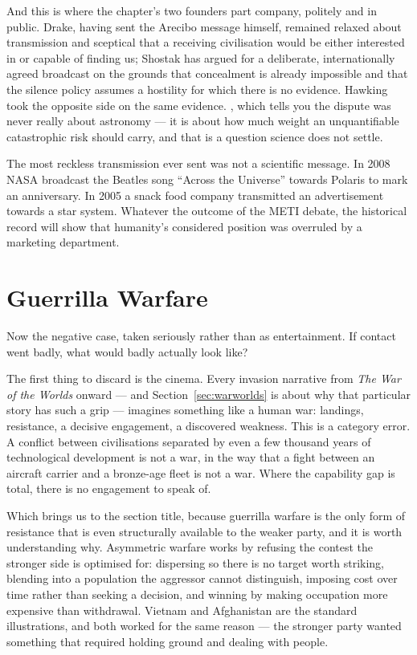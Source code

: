 And this is where the chapter's two founders part company, politely and in public. Drake, having sent
the Arecibo message himself, remained relaxed about transmission and sceptical that a receiving
civilisation would be either interested in or capable of finding us; Shostak has argued for a
deliberate, internationally agreed broadcast on the grounds that concealment is already impossible and
that the silence policy assumes a hostility for which there is no evidence. Hawking took the opposite
side on the same evidence. , which tells you the dispute was never really about astronomy --- it is about how
much weight an unquantifiable catastrophic risk should carry, and that is a question science does not
settle.

\begin{funfact}
The most reckless transmission ever sent was not a scientific message. In 2008 NASA broadcast the
Beatles song ``Across the Universe'' towards Polaris to mark an anniversary. In 2005 a snack food
company transmitted an advertisement towards a star system. Whatever the outcome of the METI debate,
the historical record will show that humanity's considered position was overruled by a marketing
department.
\end{funfact}

\section{Guerrilla Warfare}\label{sec:guerrilla}

Now the negative case, taken seriously rather than as entertainment. If contact went badly, what
would badly actually look like?

The first thing to discard is the cinema. Every invasion narrative from \emph{The War of the Worlds}
onward --- and Section~\ref{sec:warworlds} is about why that particular story has such a grip --- imagines
something like a human war: landings, resistance, a decisive engagement, a discovered weakness. This
is a category error. A conflict between civilisations separated by even a few thousand years of
technological development is not a war, in the way that a fight between an aircraft carrier and a
bronze-age fleet is not a war. Where the capability gap is total, there is no engagement to speak of.

Which brings us to the section title, because guerrilla warfare is the only form of resistance that
is even structurally available to the weaker party, and it is worth understanding why. Asymmetric
warfare works by refusing the contest the stronger side is optimised for: dispersing so there is no
target worth striking, blending into a population the aggressor cannot distinguish, imposing cost
over time rather than seeking a decision, and winning by making occupation more expensive than
withdrawal. Vietnam and Afghanistan are the standard illustrations, and both worked for the same
reason --- the stronger party wanted something that required holding ground and dealing with people.

